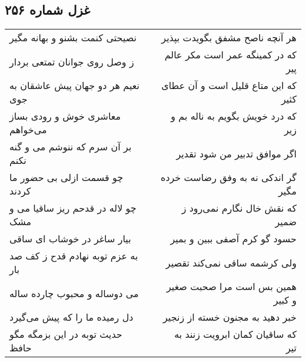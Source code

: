 \begin{center}
\section*{غزل شماره ۲۵۶}
\label{sec:sh256}
\begin{longtable}{l p{0.5cm} r}
نصیحتی کنمت بشنو و بهانه مگیر
&&
هر آنچه ناصح مشفق بگویدت بپذیر
\\
ز وصل روی جوانان تمتعی بردار
&&
که در کمینگه عمر است مکر عالم پیر
\\
نعیم هر دو جهان پیش عاشقان به جوی
&&
که این متاع قلیل است و آن عطای کثیر
\\
معاشری خوش و رودی بساز می‌خواهم
&&
که درد خویش بگویم به ناله بم و زیر
\\
بر آن سرم که ننوشم می و گنه نکنم
&&
اگر موافق تدبیر من شود تقدیر
\\
چو قسمت ازلی بی حضور ما کردند
&&
گر اندکی نه به وفق رضاست خرده مگیر
\\
چو لاله در قدحم ریز ساقیا می و مشک
&&
که نقش خال نگارم نمی‌رود ز ضمیر
\\
بیار ساغر در خوشاب ای ساقی
&&
حسود گو کرم آصفی ببین و بمیر
\\
به عزم توبه نهادم قدح ز کف صد بار
&&
ولی کرشمه ساقی نمی‌کند تقصیر
\\
می دوساله و محبوب چارده ساله
&&
همین بس است مرا صحبت صغیر و کبیر
\\
دل رمیده ما را که پیش می‌گیرد
&&
خبر دهید به مجنون خسته از زنجیر
\\
حدیث توبه در این بزمگه مگو حافظ
&&
که ساقیان کمان ابرویت زنند به تیر
\\
\end{longtable}
\end{center}
